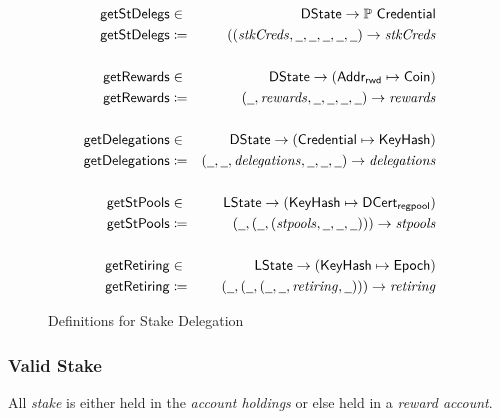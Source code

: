 \begin{figure}[ht]
  \centering
  \begin{align*}
    \fun{getStDelegs} & \in & \DState \to \powerset \Credential \\
    \fun{getStDelegs} & \coloneqq &
                                    ((\var{stkCreds}, \wcard,
                                    \wcard,\wcard,\wcard,\wcard) \to \var{stkCreds} \\
                      &&\\
    \fun{getRewards} & \in & \DState \to (\AddrRWD \mapsto \Coin) \\
    \fun{getRewards} & \coloneqq & (\wcard, \var{rewards},
                                   \wcard,\wcard,\wcard,\wcard)
                                   \to \var{rewards} \\
                      &&\\
    \fun{getDelegations} & \in & \DState \to (\Credential \mapsto \KeyHash) \\
    \fun{getDelegations} & \coloneqq & (\wcard, \wcard,
                                       \var{delegations},\wcard,\wcard,\wcard) \to
                                       \var{delegations} \\
                      &&\\
    \fun{getStPools} & \in & \LState \to (\KeyHash \mapsto \DCertRegPool) \\
    \fun{getStPools} & \coloneqq & (\wcard, (\wcard,
                                   (\var{stpools},\wcard,\wcard,\wcard))) \to \var{stpools} \\
                      &&\\
    \fun{getRetiring} & \in & \LState \to (\KeyHash \mapsto \Epoch) \\
    \fun{getRetiring} & \coloneqq & (\wcard, (\wcard,
                                    (\wcard, \wcard, \var{retiring},\wcard))) \to \var{retiring} \\
  \end{align*}

  \caption{Definitions for Stake Delegation}
  \label{fig:stake-delegation-functions}
\end{figure}

\subsubsection{Valid Stake}

\begin{property}
All \emph{stake} is either held in the \emph{account holdings} or else held in a \emph{reward account}. 
\end{property}

